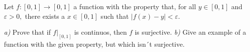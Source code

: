 Let $ f:[0,1]\longrightarrow [0,1] $ a function with the property that, for all $ y\in [0,1] $ and $ \varepsilon >0, $ there exists a $ x\in [0,1] $ such that $ |f(x)-y|<\varepsilon . $

\textit{a)} Prove that if $ \left. f\right|_{[0,1]} $ is continuos, then $ f $ is surjective.
\textit{b)} Give an example of a function with the given property, but which isn´t surjective.